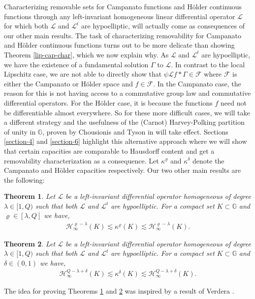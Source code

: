\documentclass[12pt,a4paper,reqno]{amsart}
\newcommand{\cg}{\Gamma}
\renewcommand{\L}{\mathcal{L}}
\newcommand{\F}{\mathcal{F}}
\renewcommand{\k}{\kappa}
\renewcommand{\l}{\lambda}
\newcommand{\G}{\mathbb{G}}
\newcommand{\h}{\mathcal{H}_{\infty}}
\numberwithin{equation}{section}
\newtheorem{thm}{Theorem}[section]
\theoremstyle{definition}
\begin{document}
Characterizing removable sets for Campanato functions and H\"{o}lder continuous functions through any left-invariant homogeneous linear differential operator $\L$ for which both $\L$ and $\L^t$ are hypoelliptic, will actually come as consequences of our other main results. The task of characterizing removability for Campanato and H\"{o}lder continuous functions turns out to be more delicate than showing Theorem \ref{lip-cap-char}, which we now explain why. As $\L$ and $\L^t$ are hypoelliptic, we have the existence of a fundamental solution $\Gamma$ to $\L$. In contrast to the local Lipschitz case, we are not able to directly show that $\psi \L f \ast \cg \in \F$ where $\F$ is either the Campanato or H\"{o}lder space and $f \in \F$. In the Campanato case, the reason for this is not having access to a commutative group law and commutative differential operators. For the H\"{o}lder case, it is because the functions $f$ need not be differentiable almost everywhere. So for these more difficult cases, we will take a different strategy and the usefulness of the (Carnot) Harvey-Polking partition of unity in $\G$, proven by Chousionis and Tyson in \cite[Lemma 3.8]{CT} will take effect. Sections \ref{section-4} and \ref{section-6} highlight this alternative approach where we will show that certain capacities are comparable to Hausdorff content and get a removability characterization as a consequence. Let $\k^{\varrho}$ and $\k^{\delta}$ denote the Campanato and H\"{o}lder capacities respectively. Our two other main results are the following: 

\begin{thm}\label{intro-cap}
    Let $\L$ be a left-invariant differential operator homogeneous of degree $\l \in [1, Q)$ such that both $\L$ and $\L^t$ are hypoelliptic. For a compact set $K \subset \G$ and $\varrho \in [\l, Q]$ we have, \begin{align*}
        \h^{\varrho -\l}(K) \lesssim \k^{\varrho}(K) \lesssim \h^{\varrho -\l}(K).
    \end{align*}
\end{thm}

\begin{thm}\label{intro-hold}
 Let $\L$ be a left-invariant differential operator homogeneous of degree $\l \in [1, Q)$ such that both $\L$ and $\L^t$ are hypoelliptic. For a compact set $K \subset \G$ and $\delta \in (0,1)$ we have, \begin{align*}
        \h^{Q -\l+\delta}(K) \lesssim \k^{\delta}(K) \lesssim \h^{Q -\l+\delta}(K).
    \end{align*}   
\end{thm}
The idea for proving Theorems \ref{intro-cap} and \ref{intro-hold} was inspired by a result of Verdera \cite{Ver}.
\end{document}

